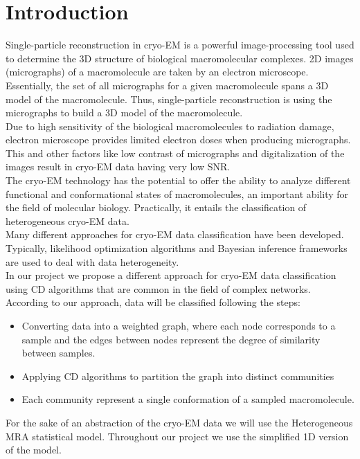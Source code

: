 \center

\section{Introduction}

\raggedright

Single-particle reconstruction in \acrshort{cryo-EM} is a powerful image-processing tool used to determine the 3D structure of biological macromolecular complexes.
2D images (micrographs) of a macromolecule are taken by an electron microscope. Essentially, the set of all micrographs for a given macromolecule spans a 3D model of the macromolecule. Thus, single-particle reconstruction is using the micrographs to build a 3D model of the macromolecule.\\

Due to high sensitivity of the biological macromolecules to radiation damage, electron microscope provides limited electron doses when producing micrographs. This and other factors like low contrast of micrographs and digitalization of the images result in \acrshort{cryo-EM} data having very low \acrfull{SNR}\cite{9016106}.\\

The \acrshort{cryo-EM} technology has the potential to offer the ability to analyze different functional and conformational states of macromolecules, an important ability for the field of molecular biology. Practically, it entails the classification of heterogeneous \acrshort{cryo-EM} data.\\

Many different approaches for \acrshort{cryo-EM} data classification have been developed. Typically, likelihood optimization algorithms and Bayesian inference frameworks are used to deal with data heterogeneity\cite{sigworth1998maximum,scheres2005fast,scheres2014beam,song2013flexibility,chowdhury2015structural}.\\ 

In our project we propose a different approach for \acrshort{cryo-EM} data classification using \acrfull{CD} algorithms that are common in the field of complex networks. According to our approach, data will be classified following the steps:
\begin{itemize}
	\item Converting data into a weighted graph, where each node corresponds to a sample and the edges between nodes represent the degree of similarity between samples.
	\item Applying \acrlong{CD} algorithms to partition the graph into distinct communities
	\item Each community represent a single conformation of a sampled macromolecule.
\end{itemize}

For the sake of an abstraction of the \acrshort{cryo-EM} data we will use the Heterogeneous \acrfull{MRA} statistical model. Throughout our project we use the simplified 1D version of the model.
